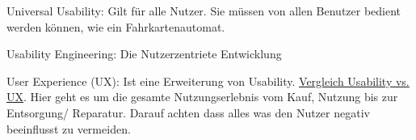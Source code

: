 \documentclass[a4paper]{article}
\begin{document}

Universal Usability: Gilt für alle Nutzer. Sie müssen von allen Benutzer bedient werden können, wie ein Fahrkartenautomat.

Usability Engineering: Die Nutzerzentriete Entwicklung

User Experience (UX): Ist eine Erweiterung von Usability. \href{https://www.usability.de/usability-user-experience.html}{Vergleich Usability vs. UX}. Hier geht es um die gesamte Nutzungserlebnis vom Kauf, Nutzung bis zur Entsorgung/ Reparatur. Darauf achten dass alles was den Nutzer negativ beeinflusst zu vermeiden.
\end{document}
